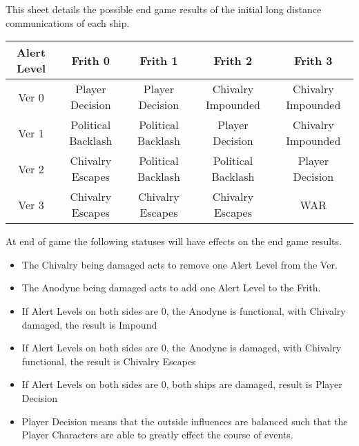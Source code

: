 \documentclass[green]{guildcamp4}
\begin{document}
\name{\gKNER{}}

This sheet details the possible end game results of the initial long distance communications of each ship.

\begin{tabular}{| c | c | c | c | c | }
	\hline
	Alert Level & Frith 0 & Frith 1 & Frith 2 & Frith 3 \\ \hline 
	Ver 0 & Player Decision & Player Decision & Chivalry Impounded & Chivalry Impounded   \\ \hline
	Ver 1 & Political Backlash & Political Backlash & Player Decision & Chivalry Impounded  \\ \hline
	Ver 2 & Chivalry Escapes & Political Backlash & Political Backlash & Player Decision  \\ \hline
	Ver 3 & Chivalry Escapes & Chivalry Escapes & Chivalry Escapes & WAR \hspace{2cm} \\ \hline

\end{tabular}


At end of game the following statuses will have effects on the end game results.

\begin{itemize}
\item The Chivalry being damaged acts to remove one Alert Level from the Ver.
\item The Anodyne being damaged acts to add one Alert Level to the Frith.
\item If Alert Levels on both sides are 0,  the Anodyne is functional, with Chivalry damaged, the result is Impound
\item If Alert Levels on both sides are 0, the Anodyne is damaged, with Chivalry functional, the result is Chivalry Escapes
\item If Alert Levels on both sides are 0, both ships are damaged, result is Player Decision
\item Player Decision means that the outside influences are balanced such that the Player Characters are able to greatly effect the course of events.

\end{itemize}
\end{document}
